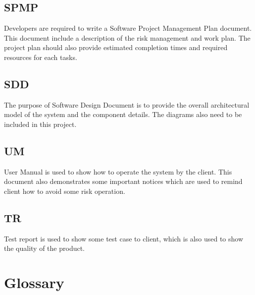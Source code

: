 \documentclass[11pt, a4paper]{report}
\begin{document}
\section{SPMP}
Developers are required to write a Software Project Management Plan document. This document include a description of the risk management and work plan. The project plan should also provide estimated completion times and required resources for each tasks.

\section{SDD}
The purpose of Software Design Document is to provide the overall architectural model of the system and the component details. The diagrams also need to be included in this project.


\section{UM}
User Manual is used to show how to operate the system by the client. This document also demonstrates some important notices which are used to remind client how to avoid some risk operation. 
\section{TR}
Test report is used to show some test case to client, which is also used to show the quality of the product. 


\pagebreak

\newpage
\appendix

\pagebreak

\chapter{Glossary}
\end{document}

